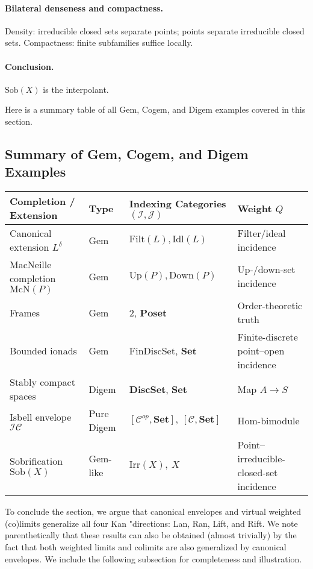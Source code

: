 \documentclass[11pt]{article}
\theoremstyle{plain}
\theoremstyle{definition}
\theoremstyle{remark}
\begin{document}
\paragraph{Bilateral denseness and compactness.}
Density: irreducible closed sets separate points; points separate irreducible closed sets.  
Compactness: finite subfamilies suffice locally.

\paragraph{Conclusion.}
$\mathrm{Sob}(X)$ is the interpolant.

Here is a summary table of all Gem, Cogem, and Digem examples covered in this section.

\subsection{Summary of Gem, Cogem, and Digem Examples}
\label{subsec:gem-summary}

\begin{center}
\renewcommand{\arraystretch}{1.25}
\begin{longtable}{@{}llll@{}}
\toprule
\textbf{Completion / Extension} & \textbf{Type} & \textbf{Indexing Categories} $(\mathcal{I},\mathcal{J})$ & \textbf{Weight $Q$} \\
\midrule
Canonical extension $L^{\delta}$ & Gem &
$\mathrm{Filt}(L),\mathrm{Idl}(L)$ &
Filter/ideal incidence \\
MacNeille completion $\mathrm{McN}(P)$ & Gem &
$\mathrm{Up}(P),\mathrm{Down}(P)$ &
Up-/down-set incidence \\
Frames & Gem & $2$, $\mathbf{Poset}$ &
Order-theoretic truth \\
Bounded ionads & Gem & $\mathrm{FinDiscSet}$, $\mathbf{Set}$ &
Finite-discrete point--open incidence \\
Stably compact spaces & Digem & $\mathbf{DiscSet}$, $\mathbf{Set}$ &
Map $A\to S$ \\
Isbell envelope $\mathcal{I}\mathcal{C}$ & Pure Digem &
$[\mathcal{C}^{op},\mathbf{Set}],\ [\mathcal{C},\mathbf{Set}]$ &
Hom-bimodule \\
Sobrification $\mathrm{Sob}(X)$ & Gem-like &
$\mathrm{Irr}(X),\ X$ &
Point--irreducible-closed-set incidence \\
\bottomrule
\end{longtable}
\end{center}

To conclude the section, we argue that canonical envelopes and virtual weighted (co)limits generalize all four Kan "directions: Lan, Ran, Lift, and Rift. We note parenthetically that these results can also be obtained (almost trivially) by the fact that both weighted limits and colimits are also generalized by canonical envelopes. We include the following subsection for completeness and illustration.
\end{document}
